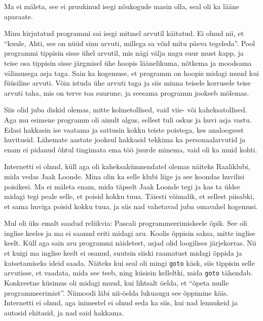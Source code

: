 
Ma ei mäleta, see ei pruukinud isegi nõukogude masin olla, seal 
oli ka lääne aparaate.

Minu kirjutatud programmi sai isegi mitmel arvutil käitatud. Ei olnud nii, et 
\enquote{kuule, Ahti, see on nüüd sinu arvuti, millega sa võid mitu päeva 
tegeleda}. Pool programmi tippisin sisse ühel arvutil, mis nägi välja nagu suur 
must kapp, ja teise osa tippisin sisse järgmisel 
ühe hoopis läänelikuma, nõtkema ja moodsama välimusega asja taga. Sain ka 
kogemuse, et programm on hoopis midagi muud kui
füüsiline arvuti. Võin istuda ühe arvuti taga ja 
siis minna teisele korrusele teise arvuti taha, mis on terve toa suurune, 
ja seesama programm jookseb mõlemas.


Siis olid juba diskid olemas, mitte kolmetollised, vaid viie- või 
kaheksatollised. Aga mu esimene programm oli ainult 
algus, sellest tuli oskus ja huvi asja vastu. 
Edasi hakkasin ise vaatama ja sattusin kokku teiste poistega, 
kes analoogsest huvitusid. Lähemate aastate jooksul hakkasid 
tekkima ka personaalarvutid ja enam ei pidanud õhtul 
tingimata ema töö juurde minema, vaid oli ka muid kohti.


Internetti ei olnud, küll aga oli kaheksakümnendatel olemas näiteks
Raaliklubi, mida vedas Jaak 
Loonde. Mina olin ka selle klubi liige ja see koondas 
huvilisi poisikesi. Ma ei mäleta enam, mida täpselt Jaak Loonde tegi ja kas ta 
üldse midagi 
tegi peale selle, et poisid kokku tuua. Täiesti võimalik, et sellest
piisabki, et sama huviga poisid kokku tuua, ja siis nad vahetavad juba omavahel 
kogemusi. 

Mul oli üks emalt saadud reliikvia: Pascali programmeerimiskeele õpik. See oli 
inglise keeles ja 
ma ei saanud eriti midagi aru. Koolis õppisin saksa,
mitte inglise keelt. Küll aga sain aru 
programmi näidetest, asjad olid loogilises järjekorras. Nii et kuigi ma inglise 
keelt ei 
osanud, suutsin siiski raamatust midagi õppida ja katsetamiseks ideid saada. 
Näiteks kui seal oli mingi 
\verb|goto| käsk, siis tippisin 
selle arvutisse, et
vaadata, mida see teeb, ning küsisin kelleltki, mida \verb|goto| tähendab. 
Konkreetne küsimus oli midagi muud, kui lihtsalt öelda, et \enquote{õpeta mulle 
programmeerimist}. Niimoodi läbi nii-öelda lukuaugu see 
õppimine käis. Internetti ei olnud, aga inimestel ei olnud seda ka siis, 
kui nad lennukeid ja autosid ehitasid, ja nad said hakkama.


